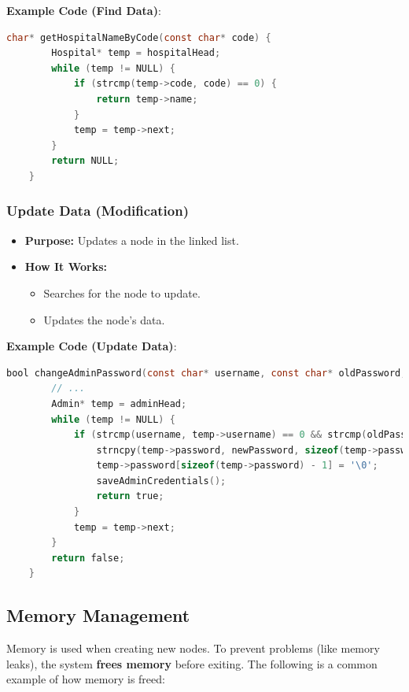 \documentclass[12pt,a4paper]{report}
\begin{document}
\normalsize \textbf{Example Code (Find Data)}:
\begin{lstlisting}[language=C, caption=Find Hospital]
    char* getHospitalNameByCode(const char* code) {
        Hospital* temp = hospitalHead;
        while (temp != NULL) {
            if (strcmp(temp->code, code) == 0) {
                return temp->name;
            }
            temp = temp->next;
        }
        return NULL;
    }
\end{lstlisting}

\subsubsection{Update Data (Modification)}
\begin{itemize}
    \item \normalsize \textbf{Purpose:} Updates a node in the linked list.
    \item \normalsize \textbf{How It Works:}
    \begin{itemize}
        \item Searches for the node to update.
        \item Updates the node's data.
    \end{itemize}
\end{itemize}

\normalsize \textbf{Example Code (Update Data)}:
\begin{lstlisting}[language=C, caption=Update Admin Password]
    bool changeAdminPassword(const char* username, const char* oldPassword, const char* newPassword) {
        // ...
        Admin* temp = adminHead;
        while (temp != NULL) {
            if (strcmp(username, temp->username) == 0 && strcmp(oldPassword, temp->password) == 0) {
                strncpy(temp->password, newPassword, sizeof(temp->password) - 1);
                temp->password[sizeof(temp->password) - 1] = '\0';
                saveAdminCredentials();
                return true;
            }
            temp = temp->next;
        }
        return false;
    }
\end{lstlisting}

\subsection{Memory Management}
Memory is used when creating new nodes. To prevent problems (like memory leaks), the system
\textbf{frees memory} before exiting.  The following is a common example of how memory is freed:
\end{document}
